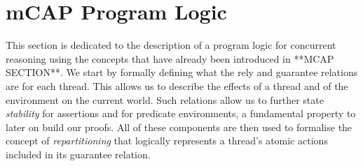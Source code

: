 \section{mCAP Program Logic}

This section is dedicated to the description of a program logic for concurrent reasoning using the concepts that have already been introduced in **MCAP SECTION**. We start by formally defining what the rely and guarantee relations are for each thread. This allows us to describe the effects of a thread and of the environment on the current world. Such relations allow us to further state \textit{stability} for assertions and for predicate environments, a fundamental property to later on build our proofs. All of these components are then used to formalise the concept of \textit{repartitioning} \cite{cap}\cite{colosl} that logically represents a thread's atomic actions included in its guarantee relation.



\newpage



\newpage



\newpage



\newpage

